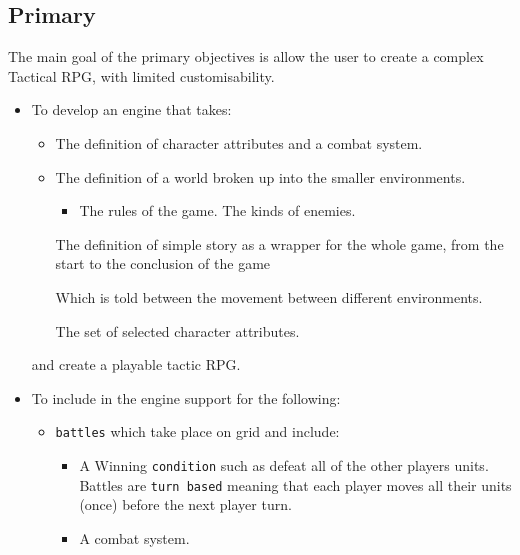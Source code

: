 \subsection{Primary}
\label{primary}
The main goal of the primary objectives is allow the user to create a complex Tactical RPG, with limited customisability.  
\begin{itemize}
\item To develop an engine that takes:
\begin{itemize}

 \item The definition of character attributes and a combat system.
	\item The definition of a world broken up into the smaller environments.
	\begin{itemize}
		\item The rules of the game.
		\cross The kinds of enemies.
	\end{itemize}
	
	\tick The definition of simple story as a wrapper for the whole game, from the start to the conclusion of the game
	\begin{itemize}
		\cross Which is told between the movement between different environments.
	\end{itemize}
	                        
	\cross The set of selected character attributes.
	
\end{itemize}
and create a playable tactic RPG.

\item To include in the engine support for the following:
\begin{itemize}
	\tick \texttt{units} with a fixed set of associated attributes such as:
	\begin{itemize}
		\tick Hit-points (which represent the health of the unit).
		\tick Strength.
		\tick Defence.
		\tick Move (The number of tiles the unit can move each turn).
	\end{itemize}
	
	\item \texttt{battles} which take place on grid and include:
	\begin{itemize}
		\tick  A set number of \texttt{units} for each player.
		\item  A Winning \texttt{condition} such as defeat all of the other players units.
		\tick  Battles are \texttt{turn based} meaning that each player moves all their units (once) before the next player turn.   
		\item  A combat system.
	\end{itemize}
	

\end{itemize}
\end{itemize}
